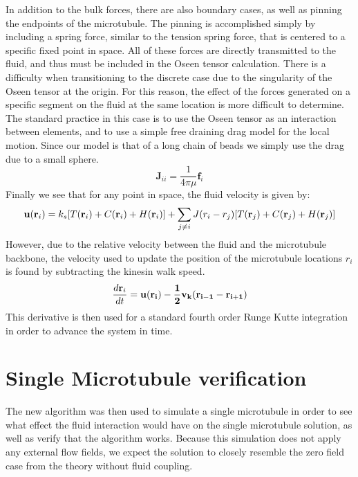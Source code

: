 \documentclass[11pt]{ucthesis}
\def\br{{\bf r}}
\begin{document}
In addition to the bulk forces, there are also boundary cases, as well as pinning the endpoints of the microtubule. The pinning is accomplished simply by including a spring force, similar to the tension spring force, that is centered to a specific fixed point in space.
All of these forces are directly transmitted to the fluid, and thus must be included in the Oseen tensor calculation. There is a difficulty when transitioning to the discrete case due to the singularity of the Oseen tensor at the origin. 
For this reason, the effect of the forces generated on a specific segment on the fluid at the same location is more difficult to determine.
The standard practice in this case is to use the Oseen tensor as an interaction between elements, and to use a simple free draining drag model for the local motion. Since our model is that of a long chain of beads we simply use the drag due to a small sphere.
\begin{equation}
\label{eq:discretesum}
\mathbf{J}_{ii} = \frac{1}{4\pi\mu} \mathbf{f}_i
\end{equation}
Finally we see that for any point in space, the fluid velocity is given by:
\begin{equation}
\label{eq:discretesum}
\mathbf{u}(\br_i) = k_s[T(\br_i) + C(\br_i) + H(\br_i)] + \sum_{j\neq i} J(r_i - r_j) [T(\br_j) + C(\br_j)+ H(\br_j)]
\end{equation}
However, due to the relative velocity between the fluid and the microtubule backbone, the velocity used to update the position of the microtubule locations $r_i$ is found by subtracting the kinesin walk speed.
\begin{equation}
\label{eq:discretevel}
\frac{d \br_i}{dt} = \bf u(\br_i) - \frac{1}{2}v_k (\br_{i-1} - \br_{i+1})
\end{equation}
This derivative is then used for a standard fourth order Runge Kutte integration in order to advance the system in time.

\section{Single Microtubule verification}
The new algorithm was then used to simulate a single microtubule in order to see what effect the fluid interaction would have on the single microtubule solution, as well as verify that the algorithm works.
Because this simulation does not apply any external flow fields, we expect the solution to closely resemble the zero field case from the theory without fluid coupling.
\end{document}
